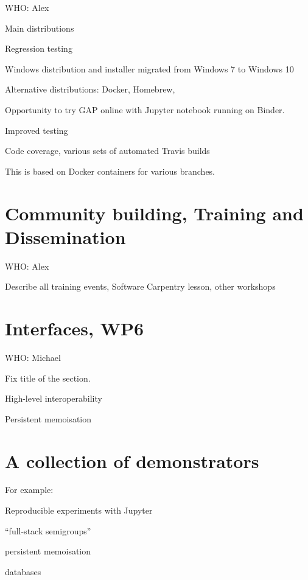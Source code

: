 \documentclass{deliverablereport}
\begin{document}
WHO: Alex

Main distributions

Regression testing

Windows distribution and installer migrated from Windows 7 to Windows 10

Alternative distributions: Docker, Homebrew, 

Opportunity to try GAP online with Jupyter notebook running on Binder.

Improved testing

Code coverage, various sets of automated Travis builds

This is based on Docker containers for various branches.

\section{Community building, Training and Dissemination}

WHO: Alex

Describe all training events, Software Carpentry lesson, other workshops

\section{Interfaces, WP6}

WHO: Michael

Fix title of the section.

High-level interoperability

Persistent memoisation

\section{A collection of demonstrators}

For example:

Reproducible experiments with Jupyter

``full-stack semigroups''

persistent memoisation

databases
\end{document}
